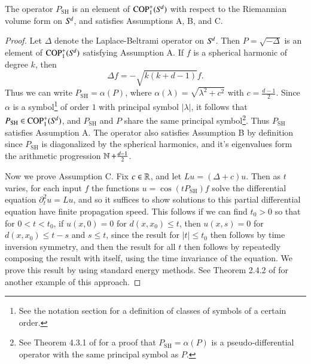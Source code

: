 \begin{lemma} \label{lemmaoijioawjdioawjdw}
  The operator $P_{\text{SH}}$ is an element of ${\text{COP}^{+}_{{1}}}({S}^{\!{d}})$ with respect to the Riemannian volume form on ${S}^{\!{d}}$, and satisfies Assumptions A, B, and C.
\end{lemma}
\begin{proof}
  Let $\Delta$ denote the Laplace-Beltrami operator on ${S}^{\!{d}}$. Then $P = \sqrt{-\Delta}$ is an element of ${\text{COP}^{+}_{{1}}}({S}^{\!{d}})$ satisfying Assumption A. If $f$ is a spherical harmonic of degree $k$, then
  \begin{equation}
    \Delta f = - \sqrt{k(k+d-1)} f.
  \end{equation}
  Thus we can write $P_{\text{SH}} = \alpha(P)$, where $\alpha(\lambda) = \sqrt{ \lambda^2 + c^2 }$ with $c = \tfrac{d-1}{2}$. Since $\alpha$ is a symbol\footnote{See the notation section for a definition of classes of symbols of a certain order.} of order $1$ with principal symbol $|\lambda|$, it follows that $P_{\text{SH}} \in {\text{COP}^{+}_{{1}}}({S}^{\!{d}})$, and $P_{\text{SH}}$ and $P$ share the same principal symbol\footnote{See Theorem 4.3.1 of \cite{Sogge} for a proof that $P_{\text{SH}} = \alpha(P)$ is a pseudo-differential operator with the same principal symbol as $P$.}. Thus $P_{\text{SH}}$ satisfies Assumption A. The operator also satisfies Assumption B by definition since $P_{\text{SH}}$ is diagonalized by the spherical harmonics, and it's eigenvalues form the arithmetic progression $\operatorname{\mathbb{N}} + \tfrac{d-1}{2}$.

  Now we prove Assumption C. Fix $c \in \operatorname{\mathbb{R}}$, and let $Lu = (\Delta + c) u$. Then as $t$ varies, for each input $f$ the functions $u = \cos(t P_{\text{SH}}) f$ solve the differential equation $\partial_t^2 u = Lu$, and so it suffices to show solutions to this partial differential equation have finite propagation speed. This follows if we can find $t_0 > 0$ so that for $0 < t < t_0$, if $u(x,0) = 0$ for $d(x,x_0) \leq t$, then $u(x,s) = 0$ for $d(x,x_0) \leq t - s$ and $s \leq t$, since the result for $|t| \leq t_0$ then follows by time inversion symmetry, and then the result for all $t$ then follows by repeatedly composing the result with itself, using the time invariance of the equation. We prove this result by using standard energy methods. See Theorem 2.4.2 of \cite{SoggeHangzhou} for another example of this approach.


\end{proof}
